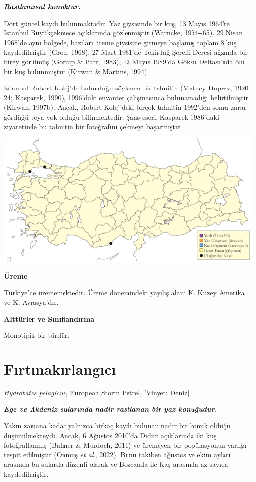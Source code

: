 \documentclass[
  a4paper,
  DIV=11,
  numbers=noendperiod]{scrreprt}
\begin{document}
\textbf{\emph{Rastlantısal konuktur.}}

Dört güncel kaydı bulunmaktadır. Yaz giysisinde bir kuş, 13 Mayıs
1964'te İstanbul Büyükçekmece açıklarında gözlenmiştir (Warncke,
1964-\/-65). 29 Nisan 1968'de aynı bölgede, bazıları üreme giysisine
girmeye başlamış toplam 8 kuş kaydedilmiştir (Groh, 1968). 27 Mart
1981'de Tekirdağ Şerefli Deresi ağzında bir birey görülmüş (Goriup \&
Parr, 1983), 13 Mayıs 1989'da Göksu Deltası'nda ölü bir kuş bulunmuştur
(Kirwan \& Martins, 1994).

İstanbul Robert Kolej'de bulunduğu söylenen bir tahnitin (Mathey-Dupraz,
1920--24; Kasparek, 1990), 1996'daki envanter çalışmasında bulunamadığı
belirtilmiştir (Kirwan, 1997b). Ancak, Robert Kolej'deki birçok tahnitin
1992'den sonra zarar gördüğü veya yok olduğu bilinmektedir. Şans eseri,
Kasparek 1986'daki ziyaretinde bu tahnitin bir fotoğrafını çekmeyi
başarmıştır.

\includegraphics{images/harita_Page_047.png}

\textbf{Üreme}

Türkiye'de ürememektedir. Üreme dönemindeki yayılış alanı K. Kuzey
Amerika ve K. Avrasya'dır.

\textbf{Alttürler ve Sınıflandırma}

Monotipik bir türdür.

\section{Fırtınakırlangıcı}\label{fux131rtux131nakux131rlangux131cux131}

\emph{Hydrobates pelagicus}, European Storm Petrel, {[}Vinyet: Deniz{]}

\textbf{\emph{Ege ve Akdeniz sularında nadir rastlanan bir yaz
konuğudur.}}

Yakın zamana kadar yalnızca birkaç kaydı bulunan nadir bir konuk olduğu
düşünülmekteydi. Ancak, 6 Ağustos 2010'da Didim açıklarında iki kuş
fotoğraflanmış (Balmer \& Murdoch, 2011) ve üremeyen bir popülasyonun
varlığı tespit edilmiştir (Onmuş \emph{et al.}, 2022). Bunu takiben
ağustos ve ekim ayları arasında bu sularda düzenli olarak ve Bozcaada
ile Kaş arasında az sayıda kaydedilmiştir.
\end{document}
